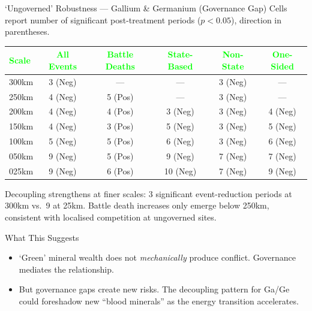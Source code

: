 \documentclass[aspectratio=169,11pt]{beamer}
\begin{document}
\begin{frame}{`Ungoverned' Robustness --- Gallium \& Germanium {\normalsize\color{muted}(Governance Gap)}}
{\footnotesize Cells report number of significant post-treatment periods ($p<0.05$), direction in parentheses.}

\vspace{0.3em}
{\footnotesize
\begin{tabular}{lccccc}
\toprule
\textcolor{lime}{\textbf{Scale}} & \textcolor{lime}{\textbf{All Events}} & \textcolor{lime}{\textbf{Battle Deaths}} & \textcolor{lime}{\textbf{State-Based}} & \textcolor{lime}{\textbf{Non-State}} & \textcolor{lime}{\textbf{One-Sided}} \\
\midrule
300km & 3 (Neg) & ---     & ---      & 3 (Neg) & ---     \\
250km & 4 (Neg) & 5 (Pos) & ---      & 3 (Neg) & ---     \\
200km & 4 (Neg) & 4 (Pos) & 3 (Neg)  & 3 (Neg) & 4 (Neg) \\
150km & 4 (Neg) & 3 (Pos) & 5 (Neg)  & 3 (Neg) & 5 (Neg) \\
100km & 5 (Neg) & 5 (Pos) & 6 (Neg)  & 3 (Neg) & 6 (Neg) \\
050km & 9 (Neg) & 5 (Pos) & 9 (Neg)  & 7 (Neg) & 7 (Neg) \\
025km & 9 (Neg) & 6 (Pos) & 10 (Neg) & 7 (Neg) & 9 (Neg) \\
\bottomrule
\end{tabular}
}

\vspace{0.4em}
{\small\color{lime} Decoupling strengthens at finer scales: 3 significant event-reduction periods at 300km vs.\ 9 at 25km. Battle death increases only emerge below 250km, consistent with localised competition at ungoverned sites.}
\end{frame}




\begin{frame}{What This Suggests}
\begin{itemize}
    \item `Green' mineral wealth does not \textit{mechanically} produce conflict. Governance mediates the relationship.
    \item But governance gaps create new risks. The decoupling pattern for Ga/Ge could foreshadow new ``blood minerals'' as the energy transition accelerates.
\end{itemize}
\end{frame}
\end{document}
